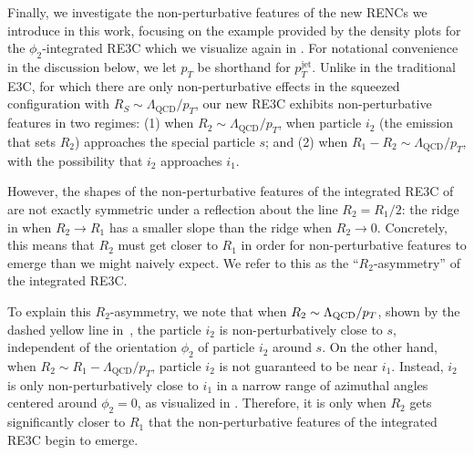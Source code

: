 

Finally, we investigate the non-perturbative features of the new RENCs we introduce in this work, focusing on the example provided by the density plots for the \(\phi_2\)-integrated RE3C which we visualize again in .
%
For notational convenience in the discussion below, we let $p_T$ be shorthand for $p_T^\text{jet}$.
%
Unlike in the traditional E3C, for which there are only non-perturbative effects in the squeezed configuration with \(R_S \sim \Lambda_\text{QCD}/p_T\), our new RE3C exhibits non-perturbative features in two regimes:  (1) when \(R_2 \sim \Lambda_\text{QCD}/p_T\), when particle \(i_2\) (the emission that sets \(R_2\)) approaches the special particle \(s\); and (2) when \(R_1 - R_2 \sim \Lambda_\text{QCD}/p_T\), with the possibility that \(i_2\) approaches \(i_1\).

However, the shapes of the non-perturbative features of the integrated RE3C of  are not exactly symmetric under a reflection about the line \(R_2 = R_1/2\):
%
the ridge in  when \(R_2 \to R_1\) has a smaller slope than the ridge when \(R_2 \to 0\).
%
Concretely, this means that \(R_2\) must get closer to \(R_1\) in order for non-perturbative features to emerge than we might naively expect.
%
We refer to this as the ``\(R_2\)-asymmetry'' of the integrated RE3C.

To explain this \(R_2\)-asymmetry, we note that when $R_2 \sim \Lambda_{\rm QCD}/p_T$, shown by the dashed yellow line in \,, the particle $i_2$ is non-perturbatively close to \(s\), independent of the orientation $\phi_2$ of particle $i_2$ around $s$.
%
On the other hand, when \(R_2 \sim R_1 - \Lambda_\text{QCD}/p_T\), particle \(i_2\) is not guaranteed to be near \(i_1\).
%
Instead, \(i_2\) is only non-perturbatively close to \(i_1\) in a narrow range of azimuthal angles centered around \(\phi_2 = 0\), as visualized in .
%
Therefore, it is only when \(R_2\) gets significantly closer to \(R_1\) that the non-perturbative features of the integrated RE3C begin to emerge.


